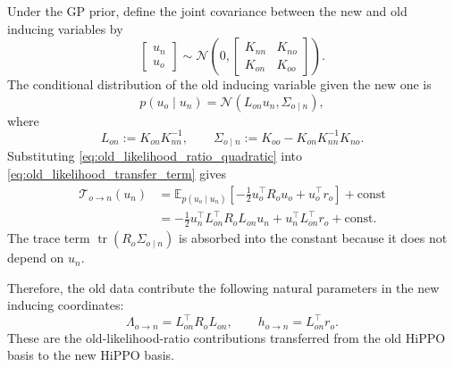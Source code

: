 \documentclass[12pt]{article}
\newcommand{\E}{\mathbb{E}}
\newcommand{\tr}{\operatorname{tr}}
\begin{document}
Under the GP prior, define the joint covariance between the new and old inducing
variables by
\begin{equation}
    \begin{bmatrix}
        u_n \\
        u_o
    \end{bmatrix}
    \sim
    \mathcal{N}
    \left(
    0,
    \begin{bmatrix}
        K_{nn} & K_{no} \\
        K_{on} & K_{oo}
    \end{bmatrix}
    \right).
    \label{eq:new_old_joint_prior}
\end{equation}
The conditional distribution of the old inducing variable given the new one is
\begin{equation}
    p(u_o\mid u_n)
    =
    \mathcal{N}
    \left(
        L_{on}u_n,
        \Sigma_{o\mid n}
    \right),
    \label{eq:old_given_new_conditional}
\end{equation}
where
\begin{equation}
    L_{on}
    :=
    K_{on}K_{nn}^{-1},
    \qquad
    \Sigma_{o\mid n}
    :=
    K_{oo}-K_{on}K_{nn}^{-1}K_{no}.
    \label{eq:old_given_new_params}
\end{equation}
Substituting \eqref{eq:old_likelihood_ratio_quadratic} into
\eqref{eq:old_likelihood_transfer_term} gives
\begin{align}
    \mathcal{T}_{o\rightarrow n}(u_n)
    &=
    \E_{p(u_o\mid u_n)}
    \left[
        -\frac{1}{2}u_o^\top R_o u_o
        +
        u_o^\top r_o
    \right]
    +
    \mathrm{const}  \\
    &=
    -\frac{1}{2}
    u_n^\top
    L_{on}^\top R_o L_{on}
    u_n
    +
    u_n^\top
    L_{on}^\top r_o
    +
    \mathrm{const}.
    \label{eq:transferred_old_likelihood_quadratic}
\end{align}
The trace term \(\tr(R_o\Sigma_{o\mid n})\) is absorbed into the constant because it
does not depend on \(u_n\).

Therefore, the old data contribute the following natural parameters in the new inducing
coordinates:
\begin{equation}
    \Lambda_{o\rightarrow n}
    =
    L_{on}^\top R_o L_{on},
    \qquad
    h_{o\rightarrow n}
    =
    L_{on}^\top r_o .
    \label{eq:old_to_new_natural_params}
\end{equation}
These are the old-likelihood-ratio contributions transferred from the old HiPPO basis to
the new HiPPO basis.
\end{document}
